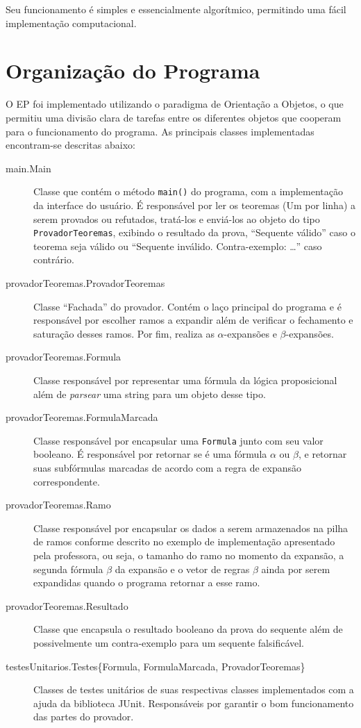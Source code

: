 \documentclass[brazil,times]{abnt}
\begin{document}
	Seu funcionamento é simples e essencialmente algorítmico, permitindo uma fácil
	implementação computacional.

\section*{Organização do Programa}
	O EP foi implementado utilizando o paradigma de Orientação a Objetos, o que
	permitiu uma divisão clara de tarefas entre os diferentes objetos que cooperam
	para o funcionamento do programa. As principais classes implementadas
	encontram-se descritas abaixo:
	
	\begin{description}
		\item[main.Main]  Classe que contém o método \texttt{main()} do programa, com
		a implementação da interface do usuário. É responsável por ler os teoremas
		(Um por linha) a serem provados ou refutados, tratá-los e enviá-los ao objeto
		do tipo \texttt{ProvadorTeoremas}, exibindo o resultado da prova, ``Sequente
		válido'' caso o teorema seja válido ou ``Sequente inválido. Contra-exemplo:
		\ldots'' caso contrário.
		\item[provadorTeoremas.ProvadorTeoremas] Classe ``Fachada'' do provador. Contém
		o laço principal do programa e é responsável por escolher ramos a expandir
		além de verificar o fechamento e saturação desses ramos. Por fim, realiza as
		$\alpha$-expansões e $\beta$-expansões.
		\item[provadorTeoremas.Formula] Classe responsável por representar uma fórmula
		da lógica proposicional além de \textit{parsear} uma string para um objeto
		desse tipo.
		\item[provadorTeoremas.FormulaMarcada] Classe responsável por encapsular uma
		\texttt{Formula} junto com seu valor booleano. É responsável por retornar se é
		uma fórmula $\alpha$ ou $\beta$, e retornar suas subfórmulas marcadas de
		acordo com a regra de expansão correspondente.
		\item[provadorTeoremas.Ramo] Classe responsável por encapsular os dados a
		serem armazenados na pilha de ramos conforme descrito no exemplo de
		implementação apresentado pela professora, ou seja, o tamanho do ramo no
		momento da expansão, a segunda fórmula $\beta$ da expansão e o vetor de
		regras $\beta$ ainda por serem expandidas quando o programa retornar a esse
		ramo.
		\item[provadorTeoremas.Resultado] Classe que encapsula o resultado booleano da
		prova do sequente além de possivelmente um contra-exemplo para um sequente
		falsificável.
		\item[testesUnitarios.Testes\{Formula, FormulaMarcada, ProvadorTeoremas\}]
		Classes de testes unitários de suas respectivas classes implementados com a
		ajuda da biblioteca JUnit. Responsáveis por garantir o bom funcionamento das
		partes do provador.
	\end{description}
	 
\end{document}

